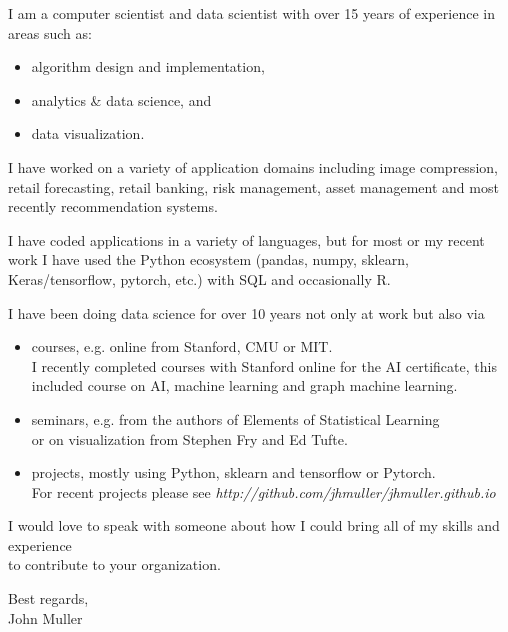 \documentclass{article}
\begin{document}
\noindent
I am a computer scientist and data scientist with over 15 years of experience in areas such as:
\begin{itemize}[noitemsep]
 \item algorithm design and implementation,
 \item analytics \& data science, and
 \item data visualization.
\end{itemize}

I have worked on a variety of application domains including image compression, retail forecasting, retail banking, risk management, asset management and most recently recommendation systems.

I have coded applications in a variety of languages, but for most or my recent work I have used the Python ecosystem (pandas, numpy, sklearn, Keras/tensorflow, pytorch, etc.)  with SQL and occasionally R.
\vspace{0.1in}

I have been doing data science for over 10 years not only at work but also via 
\begin{itemize}
 \item courses, e.g. online from Stanford, CMU or MIT.\\
 I recently completed courses with Stanford online for the AI certificate, this included course on AI, machine learning and graph machine learning.
 
 \item seminars, e.g. from the authors of Elements of  Statistical Learning \\
     \hspace*{.4in}  \>   or on visualization from Stephen Fry and Ed Tufte.
  \item projects, mostly using Python, sklearn and tensorflow or Pytorch. \\
    \hspace*{0.2in} For recent projects please see {\em {http://github.com/jhmuller/jhmuller.github.io}}
\end{itemize}



\noindent I would love to speak with someone about how I could bring all of my skills and experience \\
to contribute to your organization.

\vspace*{0.2in}
Best regards,\\
John Muller
\end{document}
